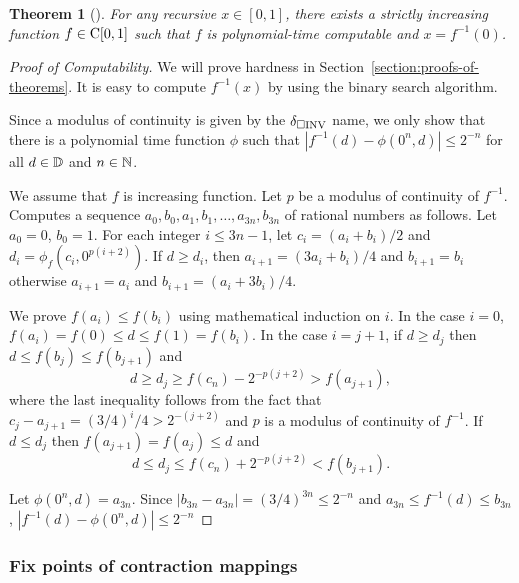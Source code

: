 \documentclass{article}
\newtheorem{theorem}{Theorem}[section]
\theoremstyle{definition}
\theoremstyle{remark}
\begin{document}
\begin{theorem}[{\cite[Theorem 4.4]{ko1991complexity}}]
For any recursive $x \in [0, 1]$, 
there exists a strictly increasing function $f \in \mathrm C[0, 1]$ 
such that $f$ is polynomial-time computable and $x = f^{-1}(0)$.
\end{theorem}


\begin{proof}[Proof of Computability]
We will prove hardness in Section~\ref{section:proofs-of-theorems}.
It is easy to compute $f^{-1}(x)$ by using the binary search algorithm.

Since a modulus of continuity is given by the $\delta _{\square \mathrm{INV}}$ name,
we only show that there is a polynomial time function $\phi$ such that 
$|f^{-1}(d) - \phi(0^n, d)| \le 2^{-n}$ for all $d \in \mathbb D$ and $n \in \mathbb N$.

We assume that $f$ is increasing function.
Let $p$ be a modulus of continuity of $f^{-1}$.
Computes a sequence  $a_0, b_0, a_1,b_1, \dots, a_{3n}, b_{3n}$ of rational numbers as follows.
Let $a_0 = 0$, $b_0 = 1$.
For each integer $i \le 3n-1$,
let $c_i = (a_i+b_i)/2$ and $d_i = \phi_f(c_i, 0^{p(i+2)})$.
If $d \ge d_i$, then $a_{i+1} = (3a_i+b_i)/4$ and $b_{i+1} = b_i$
otherwise $a_{i+1} = a_i$ and $b_{i+1} = (a_i+3b_i)/4$.

We prove $f(a_i) \le f(b_i)$ using mathematical induction on $i$.
In the case $i = 0$, $f(a_i) = f(0) \le d \le f(1) = f(b_i)$.
In the case $i=j+1$, if $d \ge d_j$ then $d \le f(b_j) \le f(b_{j+1})$ and
\begin{equation}
 d \ge d_j \ge f(c_n) - 2^{-p(j+2)} > f(a_{j+1}),
\end{equation}
where the last inequality follows from the fact that $c_j - a_{j+1} = (3/4)^i/4 > 2^{-(j+2)}$ and $p$ is a modulus of continuity of $f^{-1}$.
If $d \le d_j$ then $f(a_{j+1}) = f(a_j) \le d$ and 
\begin{equation}
 d \le d_j \le f(c_n) + 2^{-p(j+2)} < f(b_{j+1}).
\end{equation}

Let $\phi(0^n, d) = a_{3n}$.
Since $|b_{3n} - a_{3n}| = (3/4)^{3n} \le 2^{-n}$ and
$a_{3n} \le f^{-1}(d) \le b_{3n}$,
$|f^{-1}(d) - \phi(0^n, d)| \le 2^{-n}$
\end{proof}

\subsubsection{Fix points of contraction mappings}
\end{document}

